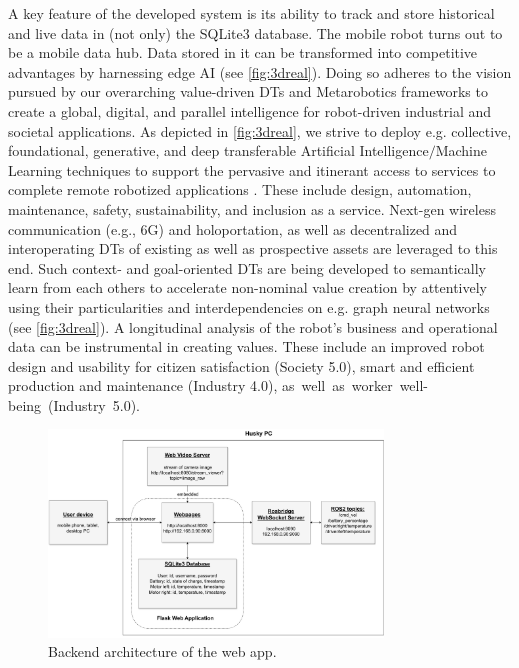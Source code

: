\documentclass[conference]{IEEEtran}
\begin{document}
A key feature of the developed system is its ability to track and store historical and live data in (not only) the SQLite3 database. The mobile robot turns out to be a mobile data hub. Data stored in it can be transformed into competitive advantages by harnessing edge AI (see \cref{fig:3dreal}). Doing so adheres to the vision pursued by our overarching value-driven DTs \cite{kaigom2020value} and Metarobotics \cite{kaigom} frameworks to create a global, digital, and parallel  intelligence for robot-driven industrial and societal applications. As depicted in \cref{fig:3dreal}, we strive  to deploy e.g. collective, foundational, generative, and deep transferable Artificial Intelligence$\slash$Machine Learning techniques to support the pervasive and itinerant access to services to complete remote robotized applications  \cite{kaigom}. These include design, automation, maintenance, safety, sustainability, and inclusion as a service. Next-gen wireless communication (e.g., 6G) and holoportation, as well as decentralized and interoperating DTs of existing as well as prospective assets are leveraged to this end. Such context- and goal-oriented DTs are being developed to {semantically} learn from each others to accelerate non-nominal value creation by attentively using their particularities and interdependencies on e.g. graph neural networks \cite{kaigom} (see \cref{fig:3dreal}). A longitudinal analysis of the robot's business and operational data can be instrumental in creating values. These include an improved robot design and usability for citizen satisfaction (Society 5.0),  smart and efficient production and maintenance (Industry 4.0), \mbox{as well as worker well-being (Industry 5.0).} %
\begin{figure}[t]
    \centerline{\includegraphics[width=8.9cm]{Pictures/userappbig.pdf}}
    \caption{Backend architecture of the web app.}
    \label{fig:userapp}
\end{figure}
\end{document}
